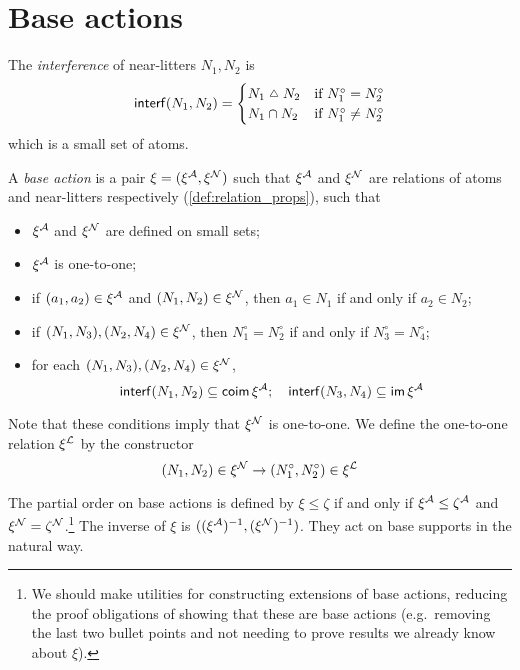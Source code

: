 \section{Base actions}
\begin{definition}
  \label{def:Interference}
  \leanok
  The \emph{interference} of near-litters \( N_1, N_2 \) is
  \[ \interf(N_1, N_2) = \begin{cases}
    N_1 \symmdiff N_2 & \text{if } N_1^\circ = N_2^\circ \\
    N_1 \cap N_2 & \text{if } N_1^\circ \neq N_2^\circ
  \end{cases} \]
  which is a small set of atoms.
\end{definition}
\begin{definition}
  \label{def:BaseAction}
  A \emph{base action} is a pair \( \xi = (\xi^{\mathcal A}, \xi^{\mathcal N}) \) such that \( \xi^{\mathcal A} \) and \( \xi^{\mathcal N} \) are relations of atoms and near-litters respectively (\cref{def:relation_props}), such that
  \begin{itemize}
    \item \( \xi^{\mathcal A} \) and \( \xi^{\mathcal N} \) are defined on small sets;
    \item \( \xi^{\mathcal A} \) is one-to-one;
    \item if \( (a_1, a_2) \in \xi^{\mathcal A} \) and \( (N_1, N_2) \in \xi^{\mathcal N} \), then \( a_1 \in N_1 \) if and only if \( a_2 \in N_2 \);
    \item if \( (N_1, N_3), (N_2, N_4) \in \xi^{\mathcal N} \), then \( N_1^\circ = N_2^\circ \) if and only if \( N_3^\circ = N_4^\circ \);
    \item for each \( (N_1, N_3), (N_2, N_4) \in \xi^{\mathcal N} \),
    \[ \operatorname{\mathsf{interf}}(N_1, N_2) \subseteq \operatorname{\mathsf{coim}} \xi^{\mathcal A};\quad \operatorname{\mathsf{interf}}(N_3, N_4) \subseteq \operatorname{\mathsf{im}} \xi^{\mathcal A} \]
  \end{itemize}
  Note that these conditions imply that \( \xi^{\mathcal N} \) is one-to-one.
  We define the one-to-one relation \( \xi^{\mathcal L} \) by the constructor
  \[ (N_1, N_2) \in \xi^{\mathcal N} \to (N_1^\circ, N_2^\circ) \in \xi^{\mathcal L} \]

  The partial order on base actions is defined by \( \xi \leq \zeta \) if and only if \( \xi^{\mathcal A} \leq \zeta^{\mathcal A} \) and \( \xi^{\mathcal N} = \zeta^{\mathcal N} \).\footnote{We should make utilities for constructing extensions of base actions, reducing the proof obligations of showing that these are base actions (e.g.\ removing the last two bullet points and not needing to prove results we already know about \( \xi \)).}
  The inverse of \( \xi \) is \( ((\xi^{\mathcal A})^{-1}, (\xi^{\mathcal N})^{-1}) \).
  They act on base supports in the natural way.
\end{definition}

